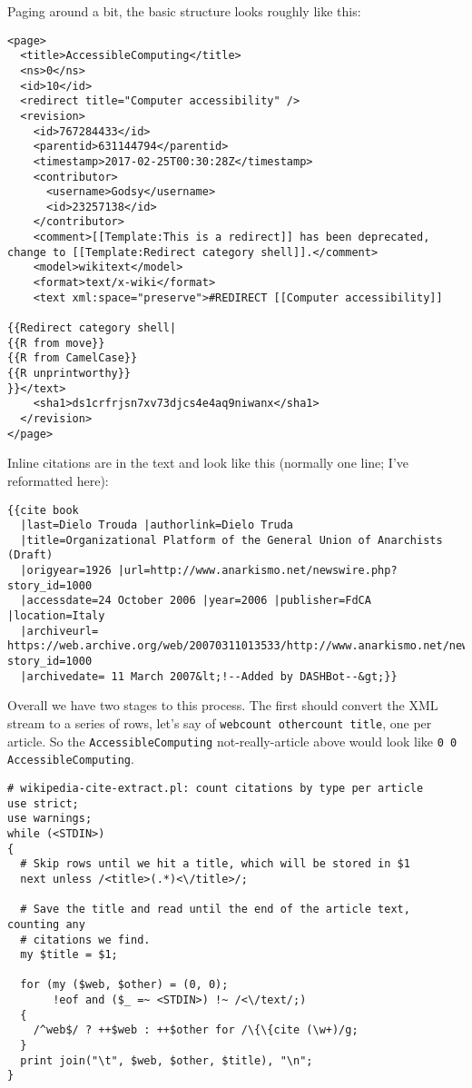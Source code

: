 Paging around a bit, the basic structure looks roughly like this:

\begin{verbatim}
<page>
  <title>AccessibleComputing</title>
  <ns>0</ns>
  <id>10</id>
  <redirect title="Computer accessibility" />
  <revision>
    <id>767284433</id>
    <parentid>631144794</parentid>
    <timestamp>2017-02-25T00:30:28Z</timestamp>
    <contributor>
      <username>Godsy</username>
      <id>23257138</id>
    </contributor>
    <comment>[[Template:This is a redirect]] has been deprecated, change to [[Template:Redirect category shell]].</comment>
    <model>wikitext</model>
    <format>text/x-wiki</format>
    <text xml:space="preserve">#REDIRECT [[Computer accessibility]]

{{Redirect category shell|
{{R from move}}
{{R from CamelCase}}
{{R unprintworthy}}
}}</text>
    <sha1>ds1crfrjsn7xv73djcs4e4aq9niwanx</sha1>
  </revision>
</page> \end{verbatim}

Inline citations are in the text and look like this (normally one line; I've
reformatted here):

\begin{verbatim}
{{cite book
  |last=Dielo Trouda |authorlink=Dielo Truda
  |title=Organizational Platform of the General Union of Anarchists (Draft)
  |origyear=1926 |url=http://www.anarkismo.net/newswire.php?story_id=1000
  |accessdate=24 October 2006 |year=2006 |publisher=FdCA |location=Italy
  |archiveurl= https://web.archive.org/web/20070311013533/http://www.anarkismo.net/newswire.php?story_id=1000
  |archivedate= 11 March 2007&lt;!--Added by DASHBot--&gt;}} \end{verbatim}

Overall we have two stages to this process. The first should convert the XML
stream to a series of rows, let's say
 of {\tt webcount
othercount title}, one per article. So the {\tt AccessibleComputing}
not-really-article above would look like {\tt 0 0 AccessibleComputing}.

\begin{verbatim}
# wikipedia-cite-extract.pl: count citations by type per article
use strict;
use warnings;
while (<STDIN>)
{
  # Skip rows until we hit a title, which will be stored in $1
  next unless /<title>(.*)<\/title>/;

  # Save the title and read until the end of the article text, counting any
  # citations we find.
  my $title = $1;

  for (my ($web, $other) = (0, 0);
       !eof and ($_ =~ <STDIN>) !~ /<\/text/;)
  {
    /^web$/ ? ++$web : ++$other for /\{\{cite (\w+)/g;
  }
  print join("\t", $web, $other, $title), "\n";
}\end{verbatim}

